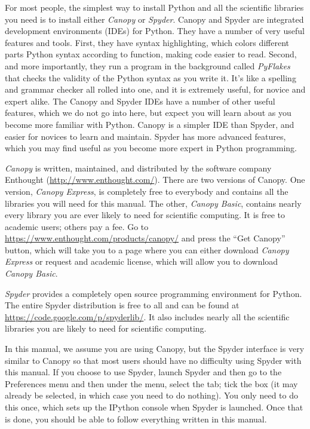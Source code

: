 \documentclass[letterpaper,10pt,english]{sphinxmanual}
\begin{document}
For most people, the simplest way to install Python and all the scientific libraries you need is to install either \emph{Canopy} or \emph{Spyder}.  Canopy and Spyder are integrated development environments (IDEs) for Python.  They have a number of very useful features and tools.  First, they have syntax highlighting, which colors different parts Python syntax according to function, making code easier to read.  Second, and more importantly, they run a program in the background called \emph{PyFlakes} that checks the validity of the Python syntax as you write it.  It's like a spelling and grammar checker all rolled into one, and it is extremely useful, for novice and expert alike.  The Canopy and Spyder IDEs have a number of other useful features, which we do not go into here, but expect you will learn about as you become more familiar with Python.  Canopy is a simpler IDE than Spyder, and easier for novices to learn and maintain.  Spyder has more advanced features, which you may find useful as you become more expert in Python programming.

\emph{Canopy} is written, maintained, and distributed by the software company Enthought (\href{http://www.enthought.com/}{http://www.enthought.com/}).  There are two versions of Canopy.  One version, \emph{Canopy Express}, is completely free to everybody and contains all the libraries you will need for this manual.  The other, \emph{Canopy Basic}, contains nearly every library you are ever likely to need for scientific computing.  It is free to academic users; others pay a fee.  Go to \href{https://www.enthought.com/products/canopy/}{https://www.enthought.com/products/canopy/} and press the ``Get Canopy'' button, which will take you to a page where you can either download \emph{Canopy Express} or request and academic license, which will allow you to download \emph{Canopy Basic}.

\emph{Spyder} provides a completely open source programming environment for Python.  The entire Spyder distribution is free to all and can be found at \href{https://code.google.com/p/spyderlib/}{https://code.google.com/p/spyderlib/}.  It also includes nearly all the scientific libraries you are likely to need for scientific computing.

In this manual, we assume you are using Canopy, but the Spyder interface is very similar to Canopy so that most users should have no difficulty using Spyder with this manual.  If you choose to use Spyder, launch Spyder and then go to the Preferences menu and then under the  menu, select the  tab; tick the box  (it may already be selected, in which case you need to do nothing).  You only need to do this once, which sets up the IPython console when Spyder is launched.  Once that is done, you should be able to follow everything written in this manual.
\end{document}
